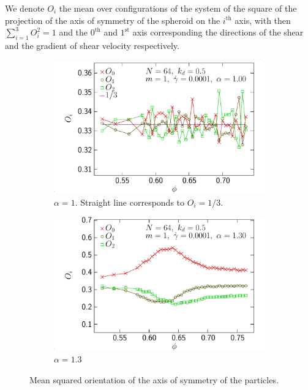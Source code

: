 \documentclass[class=report, float=false, crop=false]{standalone}
\begin{document}
We denote $O_i$ the mean over configurations of the system of the square of the projection of the axis of symmetry of the spheroid on the $i^{\text{th}}$ axis, with then $\sum_{i=1}^3 O_i^2 = 1$ and the $0^{\text{th}}$ and $1^{\text{st}}$ axis corresponding the directions of the shear and the gradient of shear velocity respectively.

\begin{figure}[h!]
\centering
    \begin{subfigure}[t]{0.49\textwidth}
        \centering
        \includegraphics[width=\textwidth]{figures/figs/ori_phi_0064_KDk500_Ml100_GDh100_EL100}
        \caption{$\alpha=1$. Straight line corresponds to $O_i=1/3$.}
        \label{ori_phi_0064_KDk500_Ml100_GDh100_EL100}
    \end{subfigure}
    \hfill
    \begin{subfigure}[t]{0.49\textwidth}
        \centering
        \includegraphics[width=\textwidth]{figures/figs/ori_phi_0064_KDk500_Ml100_GDh100_EL130}
        \caption{$\alpha=1.3$}
        \label{ori_phi_0064_KDk500_Ml100_GDh100_EL130}
    \end{subfigure}
    \caption{Mean squared orientation of the axis of symmetry of the particles.}
    \label{ori_phi_0064}
\end{figure}
\end{document}
